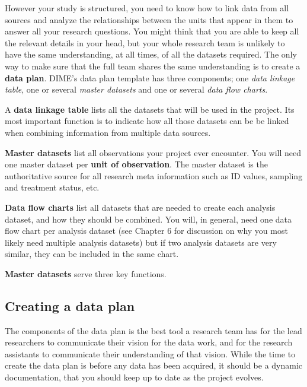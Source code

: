 However your study is structured, you need to know how to link data from all sources
and analyze the relationships between the units that appear in them
to answer all your research questions.
You might think that you are able to keep all the relevant details in your head,
but your whole research team is unlikely to have the same understanding,
at all times, of all the datasets required.
The only way to make sure that the full team shares the same understanding
is to create a \textbf{data plan}.
DIME's data plan template has three components; 
one \textit{data linkage table},
one or several \textit{master datasets}
and one or several \textit{data flow charts}. 

A \textbf{data linkage table}
lists all the datasets that will be used in the project.
Its most important function is to indicate how all those datasets can be be linked when
combining information from multiple data sources.

\textbf{Master datasets}
list all observations your project ever encounter. 
You will need one master dataset per \textbf{unit of observation}. 
The master dataset is the authoritative source for all research meta information
such as ID values, sampling and treatment status, etc.

\textbf{Data flow charts}
list all datasets that are needed to create each analysis dataset,
and how they should be combined.
You will, in general, need one data flow chart per analysis dataset 
(see Chapter 6 for discussion on why you most likely need multiple analysis datasets)
but if two analysis datasets are very similar,
they can be included in the same chart.

\textbf{Master datasets} serve three key functions.
\subsection{Creating a data plan}

The components of the data plan is the best tool a research team has for
the lead researchers to communicate their vision for the data work, 
and for the research assistants to communicate their understanding of that vision.
While the time to create the data plan is before any data has been acquired,
it should be a dynamic documentation, 
that you should keep up to date as the project evolves.

